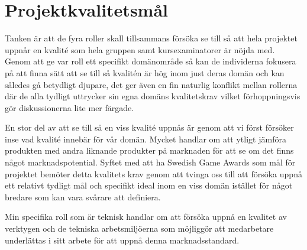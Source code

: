 \documentclass[a4paper]{report}
\begin{document}
\section*{ Projektkvalitetsmål }

Tanken är att de fyra roller skall tillsammans försöka se till så att hela
projektet uppnår en kvalité som hela gruppen samt kursexaminatorer är nöjda
med. Genom att ge var roll ett specifikt domänområde så kan de individerna
fokusera på att finna sätt att se till så kvalitén är hög inom just deras domän
och kan således gå betydligt djupare, det ger även en fin naturlig konflikt
mellan rollerna där de alla tydligt uttrycker sin egna domäns kvalitetskrav
vilket förhoppningsvis gör diskussionerna lite mer färgade.

En stor del av att se till så en viss kvalité uppnås är genom att vi först
försöker inse vad kvalité innebär för vår domän. Mycket handlar om att ytligt
jämföra produkten med andra liknande produkter på marknaden för att se om det
finns något marknadspotential. Syftet med att ha Swedish Game Awards som mål
för projektet bemöter detta kvalitets krav genom att tvinga oss till att
försöka uppnå ett relativt tydligt mål och specifikt ideal inom en viss domän
istället för något bredare som kan vara svårare att definiera.

Min specifika roll som är teknisk handlar om att försöka uppnå en kvalitet av
verktygen och de tekniska arbetsmiljöerna som möjliggör att medarbetare
underlättas i sitt arbete för att uppnå denna marknadsstandard.
\end{document}
